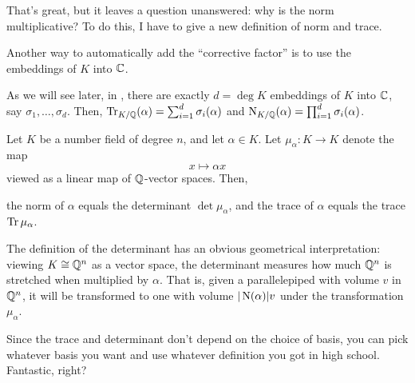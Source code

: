 That's great, but it leaves a question unanswered:
why is the norm multiplicative?
To do this, I have to give a new definition of norm and trace.

\begin{remark}
	\label{remark:norm_equal_product_embeddings}
	Another way to automatically add the ``corrective factor'' is to use the
	embeddings of $K$ into $\mathbb C$.

	As we will see later, in , there are exactly
	$d=\deg K$ embeddings of $K$ into $\mathbb C$, say $\sigma_1, \dots, \sigma_d$.
	Then,
	$\operatorname{Tr}_{K/\mathbb Q}(\alpha) = \sum_{i=1}^d \sigma_i(\alpha)$ and
	$\operatorname{N}_{K/\mathbb Q}(\alpha) = \prod_{i=1}^d \sigma_i(\alpha)$.
\end{remark}

\begin{theorem}
	Let $K$ be a number field of degree $n$, and let $\alpha \in K$.
	Let $\mu_\alpha \colon K \to K$ denote the map \[ x \mapsto \alpha x \]
	viewed as a linear map of $\mathbb Q$-vector spaces.
	Then,
	\begin{itemize}
		\ii the norm of $\alpha$ equals the determinant $\det \mu_\alpha$, and
		\ii the trace of $\alpha$ equals the trace $\operatorname{Tr} \mu_\alpha$.
	\end{itemize}
\end{theorem}
The definition of the determinant has an obvious geometrical interpretation:
viewing $K \cong \mathbb Q^n$ as a vector space, the determinant measures how much $\mathbb Q^n$ is
stretched when multiplied by $\alpha$.
That is, given a parallelepiped with volume $v$ in $\mathbb Q^n$, it will be transformed to one with
volume $|\operatorname{N}(\alpha)| v$ under the transformation $\mu_\alpha$.

Since the trace and determinant don't depend on the choice of basis,
you can pick whatever basis you want
and use whatever definition you got in high school.
Fantastic, right?

